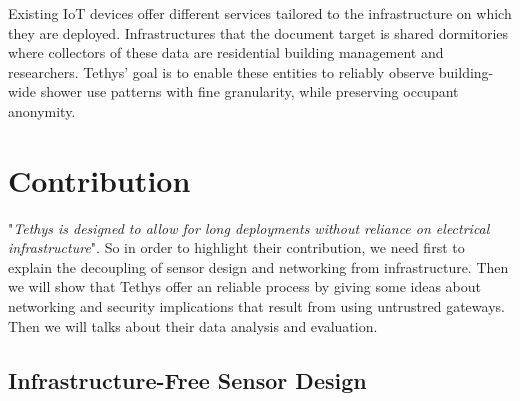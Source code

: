 \documentclass[10pt,journal,compsoc]{IEEEtran}
\begin{document}
Existing IoT devices offer different services tailored to the infrastructure on which they are deployed. Infrastructures that the document target is shared dormitories where collectors of these data are residential building management and researchers. Tethys' goal is to enable these entities to reliably observe building-wide shower use patterns with fine granularity, while preserving occupant anonymity.

\section{Contribution}\label{sec:contribution}
"\emph{Tethys is designed to allow for long deployments without
reliance on electrical infrastructure}"\cite{IEEEhowto:}. So in order to highlight their contribution, we need first to explain the decoupling of sensor design and networking from infrastructure. Then we will show that Tethys offer an reliable process by giving some ideas about networking and security implications that result from using untrustred gateways. Then we will talks about their data analysis and evaluation. 

\subsection{Infrastructure-Free Sensor Design}
\end{document}
